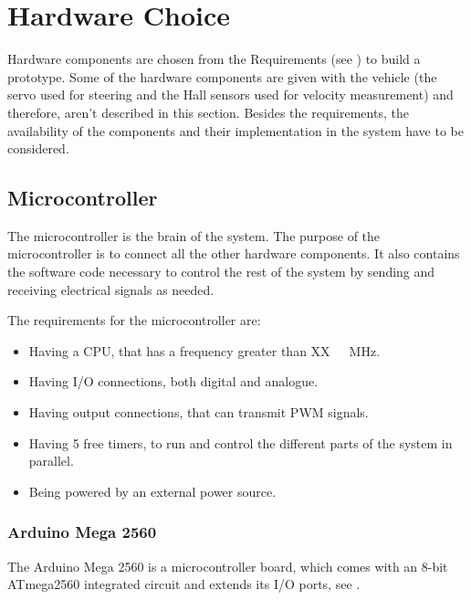 \section{Hardware Choice} \label{Hardwarechoice}
Hardware components are chosen from the Requirements (see ) to build a prototype. 
Some of the hardware components are given with the vehicle (the servo used for steering and the Hall sensors used for velocity measurement) and therefore, aren't described in this section. 
Besides the requirements, the availability of the components and their implementation in the system have to be considered.


\subsection{Microcontroller}
The microcontroller is the brain of the system. The purpose of the microcontroller is to connect all the other hardware components. It also contains the software code necessary to control the rest of the system by sending and receiving electrical signals as needed.

The requirements for the microcontroller are:
\begin{itemize}
\item Having a CPU, that has a frequency greater than \si{XX\ MHz}. 
\item Having I/O connections, both digital and analogue.
\item Having output connections, that can transmit PWM signals.
\item Having 5 free timers, to run and control the different parts of the system in parallel.
\item Being powered by an external power source.
\end{itemize}

\subsubsection{Arduino Mega 2560}
The Arduino Mega 2560 is a microcontroller board, which comes with an 8-bit ATmega2560 integrated circuit and extends its I/O ports, see  \cite{MegaInfo}. 


